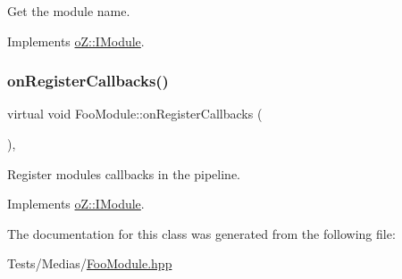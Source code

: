 Get the module name. 



Implements \mbox{\hyperlink{classo_z_1_1_i_module_af41d45158fd28e1bd86a34e25f5282d6}{o\+Z\+::\+I\+Module}}.

\mbox{\label{class_foo_module_a34a4cc51ff4c493a981d61e9d9eeeb1a}} 
\subsubsection{\texorpdfstring{onRegisterCallbacks()}{onRegisterCallbacks()}}
{\footnotesize\ttfamily virtual void Foo\+Module\+::on\+Register\+Callbacks (\begin{DoxyParamCaption}\item[{\mbox{\hyperlink{classo_z_1_1_pipeline}{o\+Z\+::\+Pipeline}} \&}]{ }\end{DoxyParamCaption})\hspace{0.3cm}{\ttfamily [inline]}, {\ttfamily [virtual]}}



Register module\textquotesingle{}s callbacks in the pipeline. 



Implements \mbox{\hyperlink{classo_z_1_1_i_module_a3dc905faa6df5e22eecc6ffbc923fd95}{o\+Z\+::\+I\+Module}}.



The documentation for this class was generated from the following file\+:\begin{DoxyCompactItemize}
\item 
Tests/\+Medias/\mbox{\hyperlink{_foo_module_8hpp}{Foo\+Module.\+hpp}}\end{DoxyCompactItemize}
